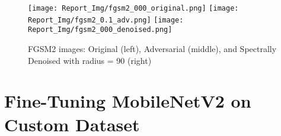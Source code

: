 \documentclass[a4paper,12pt]{report}%
\begin{document}
\begin{figure}[!htb]
  \texttt{[image: Report\_Img/fgsm2\_000\_original.png]}
\endminipage\hfill
{}
  \texttt{[image: Report\_Img/fgsm2\_0.1\_adv.png]}
\endminipage\hfill
{}
  \texttt{[image: Report\_Img/fgsm2\_000\_denoised.png]}
\endminipage\hfill
\caption{FGSM2 images: Original (left), Adversarial (middle), and Spectrally Denoised with radius = 90 (right)}\label{fig:fgsm2_denoised}
\end{figure}

\chapter{Fine-Tuning MobileNetV2 on Custom Dataset}
\end{document}
